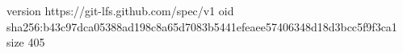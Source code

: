version https://git-lfs.github.com/spec/v1
oid sha256:b43c97dca05388ad198c8a65d7083b5441efeaee57406348d18d3bcc5f9f3ca1
size 405

